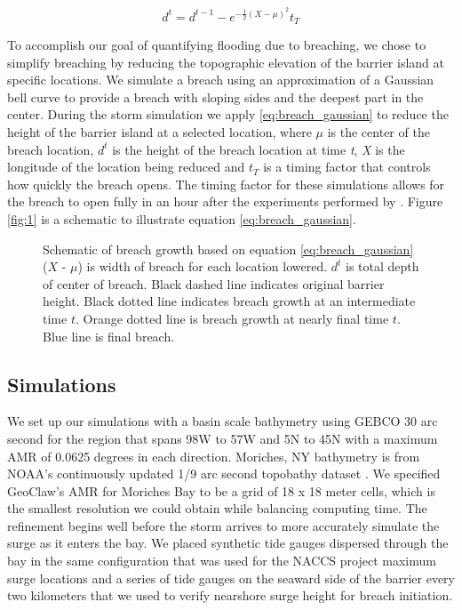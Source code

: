 \documentclass{coastal_paper}
\begin{document}
\begin{equation}
    d^t = d^{t-1} - e^{-\frac{1}{2}{(X - \mu)^2}}t_T
    \label{eq:breach_gaussian}
\end{equation}

To accomplish our goal of quantifying flooding due to breaching, we chose to simplify breaching by reducing the topographic elevation of the barrier island at specific locations. We simulate a breach using an approximation of a Gaussian bell curve to provide a breach with sloping sides and the deepest part in the center. During the storm simulation we apply \ref{eq:breach_gaussian} to reduce the height of the barrier island at a selected location, where \emph{$\mu$} is the center of the breach location, \emph{$d^t$} is the height of the breach location at time \emph{t}, \emph{X} is the longitude of the location being reduced and \emph{$t_T$} is a timing factor that controls how quickly the breach opens. The timing factor for these simulations allows for the breach to open fully in an hour after the experiments performed by \citet{Visser1999}. Figure \ref{fig:1} is a schematic to illustrate equation \ref{eq:breach_gaussian}.

\begin{figure}[ht]
    \centering
    \resizebox{\textwidth}{!}{%
            
        }
    \caption{Schematic of breach growth based on equation \ref{eq:breach_gaussian} ($X$ - $\mu$) is width of breach for each location lowered. $d^t$ is total depth of center of breach. Black dashed line indicates original barrier height. Black dotted line indicates breach growth at an intermediate time $t$. Orange dotted line is breach growth at nearly final time $t$. Blue line is final breach.}
    \label{fig:2}
\end{figure}

\subsection{Simulations} 
We set up our simulations with a basin scale bathymetry using GEBCO 30 arc second \citep{weatherall2015new} for the region that spans 98W to 57W and 5N to 45N with a maximum AMR of 0.0625 degrees in each direction. Moriches, NY bathymetry is from NOAA's continuously updated 1/9 arc second topobathy dataset \citep{Cooperative_Institute_for_Research_in_Environmental_Sciences2014-ix}. We specified GeoClaw's AMR for Moriches Bay to be a grid of 18 x 18 meter cells, which is the smallest resolution we could obtain while balancing computing time. The refinement begins well before the storm arrives to more accurately simulate the surge as it enters the bay. We placed synthetic tide gauges dispersed through the bay in the same configuration that was used for the NACCS project maximum surge locations \citep{cialone2015north} and a series of tide gauges on the seaward side of the barrier every two kilometers that we used to verify nearshore surge height for breach initiation.
\end{document}

